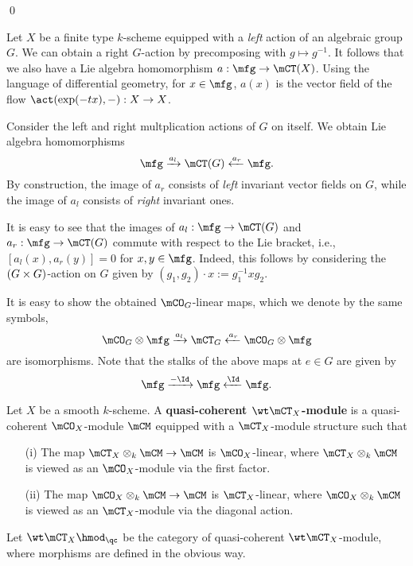 	\qed

	\begin{rem}
		Let $X$ be a finite type $k$-scheme equipped with a \emph{left} action of an algebraic group $G$. We can obtain a right $G$-action by precomposing with $g\mapsto g^{-1}$. It follows that we also have a Lie algebra homomorphism $a: \mfg\to \mCT(X)$. Using the language of differential geometry, for $x\in \mfg$, $a(x)$ is the vector field of the flow $\act(\exp(-tx),-): X \to X$. 

	\end{rem}


	\begin{exam}
		Consider the left and right multplication actions of $G$ on itself. We obtain Lie algebra homomorphisms
		\[
			\mfg \xrightarrow{a_l} \mCT(G) \xleftarrow{a_r} \mfg.
		\]
		By construction, the image of $a_r$ consists of \emph{left} invariant vector fields on $G$, while the image of $a_l$ consists of \emph{right} invariant ones. 

		It is easy to see that the images of $a_l: \mfg \to \mCT(G)$ and $a_r: \mfg \to \mCT(G)$ commute with respect to the Lie bracket, i.e., $[a_l(x), a_r(y)] = 0$ for $x,y\in \mfg$. Indeed, this follows by considering the $(G\mt G)$-action on $G$ given by $(g_1,g_2)\cdot x := g_1^{-1}xg_2$.

		It is easy to show the obtained $\mCO_G$-linear maps, which we denote by the same symbols,
		\[
			\mCO_G \ot \mfg \xrightarrow{a_l} \mCT_G \xleftarrow{a_r} \mCO_G \ot \mfg
		\]
		are isomorphisms. Note that the stalks of the above maps at $e\in G$ are given by
		\[
			\mfg \xrightarrow{ -\Id } \mfg \xleftarrow{\Id} \mfg.
		\]
	\end{exam}

	\begin{defn}
		\label{defn-module-for-Lie-algebroid}
		Let $X$ be a smooth $k$-scheme. A \textbf{quasi-coherent $\wt\mCT_{X}$-module} is a quasi-coherent $\mCO_X$-module $\mCM$ equipped with a $\mCT_{X}$-module structure such that 
		\begin{itemize}
			\item[(i)]
				The map $\mCT_X\ot_k \mCM \to \mCM$ is $\mCO_X$-linear, where $\mCT_X\ot_k \mCM$ is viewed as an $\mCO_X$-module via the first factor.
			\item[(ii)]
				The map $\mCO_X \ot_k \mCM \to \mCM$ is $\mCT_{X}$-linear, where $\mCO_X \ot_k \mCM $ is viewed as an $\mCT_X$-module via the diagonal action.
		\end{itemize}
		Let $\wt\mCT_X\hmod_\qc$ be the category of quasi-coherent $\wt\mCT_{X}$-module, where morphisms are defined in the obvious way.
	\end{defn}

